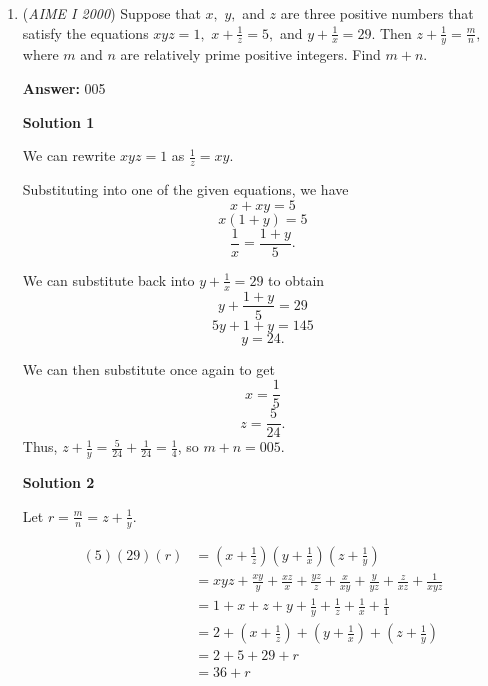 \begin{enumerate}
First we see that our condition is $\frac{x+y}{2} = 2 + \sqrt{xy}$. Then we can see that $x+y = 4 + 2\sqrt{xy}$. From trying a simple example to figure out conditions for $x,y$, we want to find $x-y$ so we can isolate for $x$. From doing the example we can note that we can square both sides and subtract $4xy$: $(x-y)^2 = 16 + 16\sqrt{xy} \implies x-y = -2( \sqrt{1+\sqrt{xy}})$ (note it is negative because $y > x$. Clearly the square root must be an integer, so now let $\sqrt{xy} = a^2-1$. Thus $x-y = -2a$. Thus $x = 2 + \sqrt{xy} - a = 2 + a^2 - 1 -2a$. We can then find $y$, and use the quadratic formula on $x,y$ to ensure they are $>0$ and $<10^6$ respectively. Thus we get that $y$ can go up to 999 and $x$ can go down to $3$, leaving $997$ possibilities for $x,y$.

 


	\item (\textit{AIME I 2000}) Suppose that $x,$ $y,$ and $z$ are three positive numbers that satisfy the equations $xyz = 1,$ $x + \frac {1}{z} = 5,$ and $y + \frac {1}{x} = 29.$ Then $z + \frac {1}{y} = \frac {m}{n},$ where $m$ and $n$ are relatively prime positive integers. Find $m + n$.


 
 \textbf{Answer: }005



\textbf{Solution 1}

We can rewrite $xyz=1$ as $\frac{1}{z}=xy$.

 Substituting into one of the given equations, we have 
 \[x+xy=5\]
 \[x(1+y)=5\]
 \[\frac{1}{x}=\frac{1+y}{5}.\]

 We can substitute back into $y+\frac{1}{x}=29$ to obtain
 \[y+\frac{1+y}{5}=29\]
 \[5y+1+y=145\]
 \[y=24.\]

 We can then substitute once again to get
 \[x=\frac15\]
 \[z=\frac{5}{24}.\]Thus, $z+\frac1y=\frac{5}{24}+\frac{1}{24}=\frac{1}{4}$, so $m+n=\boxed{005}$.

 



\textbf{Solution 2}

Let $r = \frac{m}{n} = z + \frac {1}{y}$.

 
 \begin{align*} (5)(29)(r)&=\left(x + \frac {1}{z}\right)\left(y + \frac {1}{x}\right)\left(z + \frac {1}{y}\right)\\ &=xyz + \frac{xy}{y} + \frac{xz}{x} + \frac{yz}{z} + \frac{x}{xy} + \frac{y}{yz} + \frac{z}{xz} + \frac{1}{xyz}\\ &=1 + x + z + y + \frac{1}{y} + \frac{1}{z} + \frac{1}{x} + \frac{1}{1}\\ &=2 + \left(x + \frac {1}{z}\right) + \left(y + \frac {1}{x}\right) + \left(z + \frac {1}{y}\right)\\ &=2 + 5 + 29 + r\\ &=36 + r \end{align*}



\end{enumerate}
